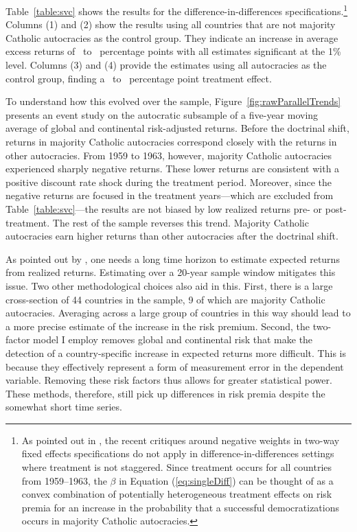 \documentclass[12pt]{article}
\numberwithin{equation}{section}
\begin{document}
Table~\ref{table:svc} shows the results for the difference-in-differences specifications.\footnote{As pointed out in \cite*{GoldsmithPinkham2022}, the recent critiques around negative weights in two-way fixed effects specifications do not apply in difference-in-differences settings where treatment is not staggered. Since treatment occurs for all countries from 1959--1963, the $\beta$ in Equation (\ref{eq:singleDiff}) can be thought of as a convex combination of potentially heterogeneous treatment effects on risk premia for an increase in the probability that a successful democratizations occurs in majority Catholic autocracies.} Columns (1) and (2) show the results using all countries that are not majority Catholic autocracies as the control group. They indicate an increase in average excess returns of \tabSevencolTwoPE\ to \tabSevencolOnePE\ percentage points with all estimates significant at the 1\% level.  Columns (3) and (4) provide the estimates using all autocracies as the control group, finding a \tabSevencolFourPE\ to \tabSevencolThreePE\ percentage point treatment effect.

To understand how this evolved over the sample, Figure~\ref{fig:rawParallelTrends} presents an event study on the autocratic subsample of a five-year moving average of global and continental risk-adjusted returns.  Before the doctrinal shift, returns in majority Catholic autocracies correspond closely with the returns in other autocracies. From 1959 to 1963, however, majority Catholic autocracies experienced sharply negative returns. These lower returns are consistent with a positive discount rate shock during the treatment period. Moreover, since the negative returns are focused in the treatment years---which are excluded from Table~\ref{table:svc}---the results are not biased by low realized returns pre- or post-treatment. The rest of the sample reverses this trend. Majority Catholic autocracies earn higher returns than other autocracies after the doctrinal shift.

As pointed out by \cite{Merton1980}, one needs a long time horizon to estimate expected returns from realized returns.  Estimating over a 20-year sample window mitigates this issue. Two other methodological choices also aid in this. First, there is a large cross-section of 44 countries in the sample, 9 of which are majority Catholic autocracies. Averaging across a large group of countries in this way should lead to a more precise estimate of the increase in the risk premium. Second, the two-factor model I employ removes global and continental risk that make the detection of a country-specific increase in expected returns more difficult. This is because they effectively represent a form of measurement error in the dependent variable. Removing these risk factors thus allows for greater statistical power. These methods, therefore, still pick up differences in risk premia despite the somewhat short time series.
\end{document}
